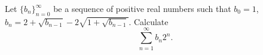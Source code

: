 \documentclass{article}
\begin{document}
	\setlength{\parindent}{0pt}
	Let $\{b_n\}_{n=0}^\infty$ be a sequence of positive real numbers such that $b_0=1$, $b_n=2+\sqrt{b_{n-1}}-2\sqrt{1+\sqrt{b_{n-1}}}$. Calculate
	$$\sum_{n=1}^{\infty}b_n 2^n.$$
\end{document}
